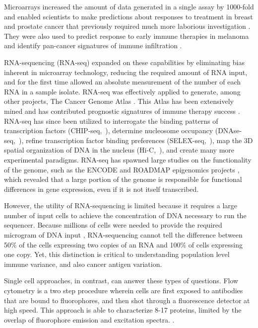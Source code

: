 Microarrays increased the amount of data generated in a single assay by 1000-fold and enabled scientists to make predictions about responses to treatment in breast and prostate cancer that previously required much more laborious investigation \citep{Glinsky2004, VantVeer2002}. 
They were also used to predict response to early immune therapies in melanoma \citep{Monsurro2004} and identify pan-cancer signatures of immune infiltration \citep{Chifman2016}.

RNA-sequencing (RNA-seq) expanded on these capabilities by eliminating bias inherent in microarray technology, reducing the required amount of RNA input, and for the first time allowed an absolute measurement of the number of each RNA in a sample isolate.
RNA-seq was effectively applied to generate, among other projects, The Cancer Genome Atlas \citep{McLendon2008,Network2011}.
This Atlas has been extensively mined and has contributed prognostic signatures of immune therapy success \citep{Senbabaoglu2016}.
RNA-seq has since been utilized to interrogate the binding patterns of transcription factors (CHIP-seq,~\cite{Johnson2007}), determine nucleosome occupancy (DNAse-seq,~\cite{Boyle2008}), refine transcription factor binding preferences (SELEX-seq,~\cite{Riley2014}), map the 3D spatial organization of DNA in the nucleus (Hi-C,~\cite{Belton2012}), and create many more experimental paradigms.
RNA-seq has spawned large studies on the functionality of the genome, such as the ENCODE \citep{Consortium2012} and ROADMAP epigenomics projects \citep{Kundaje2015}, which revealed that a large portion of the genome is responsible for functional differences in gene expression, even if it is not itself transcribed. 

However, the utility of RNA-sequencing is limited because it requires a large number of input cells to achieve the concentration of DNA necessary to run the sequencer.
Because millions of cells were needed to provide the required microgram of DNA input \citep{Wilhelm2009}, RNA-sequencing cannot tell the difference between 50\% of the cells expressing two copies of an RNA and 100\% of cells expressing one copy. 
Yet, this distinction is critical to understanding population level immune variance, and also cancer antigen variation. 

Single cell approaches, in contrast, can answer these types of questions. 
Flow cytometry is a two step procedure wherein cells are first exposed to antibodies that are bound to fluorophores, and then shot through a fluorescence detector at high speed. 
This approach is able to characterize 8-17 proteins, limited by the overlap of fluorophore emission and excitation spectra. \citep{Perfetto2004}.

